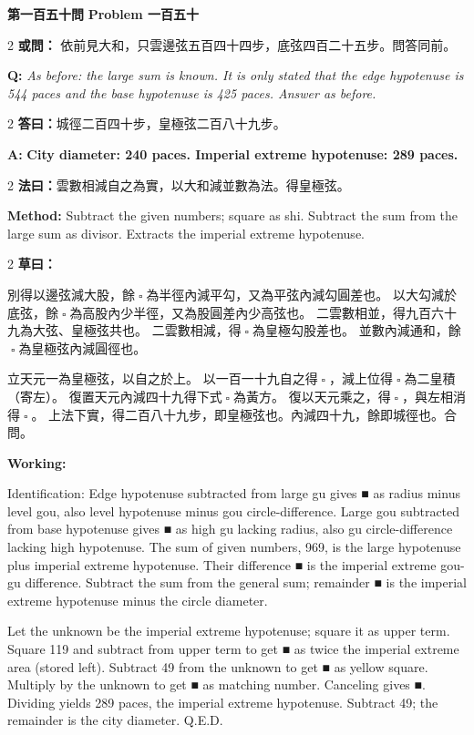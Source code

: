 \documentclass[11pt,a4paper]{article}
\let\origsquare\square
\renewcommand{\square}{\ensuremath{\origsquare}}%
\newcommand{\wen}[1]{%
  \par\vspace{0.5em}%
  \noindent\textcolor{problemcolor}{\textbf{第#1問}}%
  \hfill\textcolor{problemcolor}{\textbf{Problem #1}}\par\nopagebreak%
  \vspace{0.3em}%
}
\newcommand{\owen}[1]{%
  \noindent\textcolor{problemcolor}{\textbf{或問：}}{\tradfont #1}\par\nopagebreak%
}
\newcommand{\oweneng}[1]{%
  \noindent\textcolor{engcolor}{\textbf{Q: }}{\itshape #1}\par\nopagebreak%
}
\newcommand{\fayue}[1]{%
  \noindent\textcolor{methodcolor}{\textbf{法曰：}}{\tradfont #1}\par\nopagebreak%
}
\newcommand{\fayueeng}[1]{%
  \noindent\textcolor{engcolor}{\textbf{Method: }}{#1}\par\nopagebreak%
}
\newcommand{\tsaoyue}[1]{%
  \noindent\textcolor{workcolor}{\textbf{草曰：}}{\tradfont #1}\par%
}
\newcommand{\tsaoyueeng}[1]{%
  \noindent\textcolor{engcolor}{\textbf{Working: }}{\small #1}\par%
}
\newcommand{\dayue}[1]{%
  \noindent\textcolor{anscolor}{\textbf{答曰：}}{\tradfont #1}\par\nopagebreak%
}
\newcommand{\dayueeng}[1]{%
  \noindent\textcolor{engcolor}{\textbf{A: }}{\bfseries #1}\par\nopagebreak%
}
\begin{document}
\vspace{0.5cm}

\wen{一百五十}

\begin{paracol}{2}
\owen{%
依前見大和，只雲邊弦五百四十四步，底弦四百二十五步。問答同前。}
\switchcolumn
\oweneng{%
As before: the large sum is known. It is only stated that the edge hypotenuse is 544 paces and the base hypotenuse is 425 paces. Answer as before.}
\end{paracol}

\begin{paracol}{2}
\dayue{城徑二百四十步，皇極弦二百八十九步。}
\switchcolumn
\dayueeng{City diameter: 240 paces. Imperial extreme hypotenuse: 289 paces.}
\end{paracol}

\begin{paracol}{2}
\fayue{雲數相減自之為實，以大和減並數為法。得皇極弦。}
\switchcolumn
\fayueeng{Subtract the given numbers; square as shi. Subtract the sum from the large sum as divisor. Extracts the imperial extreme hypotenuse.}
\end{paracol}

\begin{paracol}{2}
\tsaoyue{%
別得以邊弦減大股，餘$ \; \square \; $為半徑內減平勾，又為平弦內減勾圓差也。
以大勾減於底弦，餘$ \; \square \; $為高股內少半徑，又為股圓差內少高弦也。
二雲數相並，得九百六十九為大弦、皇極弦共也。
二雲數相減，得$ \; \square \; $為皇極勾股差也。
並數內減通和，餘$ \; \square \; $為皇極弦內減圓徑也。

立天元一為皇極弦，以自之於上。
以一百一十九自之得$ \; \square \; $，減上位得$ \; \square \; $為二皇積（寄左）。
復置天元內減四十九得下式$ \; \square \; $為黃方。
復以天元乘之，得$ \; \square \; $，與左相消得$ \; \square \; $。
上法下實，得二百八十九步，即皇極弦也。內減四十九，餘即城徑也。合問。}
\switchcolumn
\tsaoyueeng{%
Identification: Edge hypotenuse subtracted from large gu gives ■ as radius minus level gou, also level hypotenuse minus gou circle-difference. Large gou subtracted from base hypotenuse gives ■ as high gu lacking radius, also gu circle-difference lacking high hypotenuse. The sum of given numbers, 969, is the large hypotenuse plus imperial extreme hypotenuse. Their difference ■ is the imperial extreme gou-gu difference. Subtract the sum from the general sum; remainder ■ is the imperial extreme hypotenuse minus the circle diameter.

Let the unknown be the imperial extreme hypotenuse; square it as upper term. Square 119 and subtract from upper term to get ■ as twice the imperial extreme area (stored left). Subtract 49 from the unknown to get ■ as yellow square. Multiply by the unknown to get ■ as matching number. Canceling gives ■. Dividing yields 289 paces, the imperial extreme hypotenuse. Subtract 49; the remainder is the city diameter. Q.E.D.}
\end{paracol}
\end{document}
